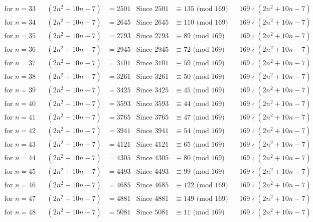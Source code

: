 \documentclass[12pt]{article}
\begin{document}
\begin{align*}
\text{for $n = 33 $}&& (2n^2+10n-7) &= 2501 & \text{Since } 2501  &\equiv  135 \text{ (mod $169$)}&& 169 \nmid (2n^2+10n-7)\\
\text{for $n = 34 $}&& (2n^2+10n-7) &= 2645 & \text{Since } 2645  &\equiv  110 \text{ (mod $169$)}&& 169 \nmid (2n^2+10n-7)\\
\text{for $n = 35 $}&& (2n^2+10n-7) &= 2793 & \text{Since } 2793  &\equiv  89 \text{ (mod $169$)}&& 169 \nmid (2n^2+10n-7)\\
\text{for $n = 36 $}&& (2n^2+10n-7) &= 2945 & \text{Since } 2945  &\equiv  72 \text{ (mod $169$)}&& 169 \nmid (2n^2+10n-7)\\
\text{for $n = 37 $}&& (2n^2+10n-7) &= 3101 & \text{Since } 3101  &\equiv  59 \text{ (mod $169$)}&& 169 \nmid (2n^2+10n-7)\\
\text{for $n = 38 $}&& (2n^2+10n-7) &= 3261 & \text{Since } 3261  &\equiv  50 \text{ (mod $169$)}&& 169 \nmid (2n^2+10n-7)\\
\text{for $n = 39 $}&& (2n^2+10n-7) &= 3425 & \text{Since } 3425  &\equiv  45 \text{ (mod $169$)}&& 169 \nmid (2n^2+10n-7)\\
\text{for $n = 40 $}&& (2n^2+10n-7) &= 3593 & \text{Since } 3593  &\equiv  44 \text{ (mod $169$)}&& 169 \nmid (2n^2+10n-7)\\
\text{for $n = 41 $}&& (2n^2+10n-7) &= 3765 & \text{Since } 3765  &\equiv  47 \text{ (mod $169$)}&& 169 \nmid (2n^2+10n-7)\\
\text{for $n = 42 $}&& (2n^2+10n-7) &= 3941 & \text{Since } 3941  &\equiv  54 \text{ (mod $169$)}&& 169 \nmid (2n^2+10n-7)\\
\text{for $n = 43 $}&& (2n^2+10n-7) &= 4121 & \text{Since } 4121  &\equiv  65 \text{ (mod $169$)}&& 169 \nmid (2n^2+10n-7)\\
\text{for $n = 44 $}&& (2n^2+10n-7) &= 4305 & \text{Since } 4305  &\equiv  80 \text{ (mod $169$)}&& 169 \nmid (2n^2+10n-7)\\
\text{for $n = 45 $}&& (2n^2+10n-7) &= 4493 & \text{Since } 4493  &\equiv  99 \text{ (mod $169$)}&& 169 \nmid (2n^2+10n-7)\\
\text{for $n = 46 $}&& (2n^2+10n-7) &= 4685 & \text{Since } 4685  &\equiv  122 \text{ (mod $169$)}&& 169 \nmid (2n^2+10n-7)\\
\text{for $n = 47 $}&& (2n^2+10n-7) &= 4881 & \text{Since } 4881  &\equiv  149 \text{ (mod $169$)}&& 169 \nmid (2n^2+10n-7)\\
\text{for $n = 48 $}&& (2n^2+10n-7) &= 5081 & \text{Since } 5081  &\equiv  11 \text{ (mod $169$)}&& 169 \nmid (2n^2+10n-7)\\

\end{align*}
\end{document}
